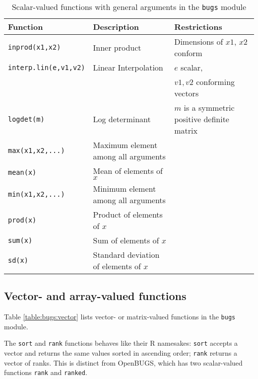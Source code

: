 \documentclass[11pt, a4paper, titlepage]{report}
\newcommand{\OpenBUGS}{\textsf{OpenBUGS}}
\begin{document}
\begin{table}
\begin{tabular}{lll}
\hline
Function & Description & Restrictions \\
\hline
\verb+inprod(x1,x2)+ & Inner product & Dimensions of $x1$, $x2$ conform \\
\verb+interp.lin(e,v1,v2)+ & Linear Interpolation & $e$ scalar, \\
                          &                     & $v1,v2$ conforming vectors \\
\verb+logdet(m)+ & Log determinant & $m$ is a symmetric positive definite matrix \\
\verb+max(x1,x2,...)+ & Maximum element among all arguments & \\
\verb+mean(x)+  & Mean of elements of $x$ & \\
\verb+min(x1,x2,...)+ & Minimum element among all arguments & \\
\verb+prod(x)+  & Product of elements of $x$ & \\
\verb+sum(x)+   & Sum of elements of $x$& \\
\verb+sd(x)+    & Standard deviation of elements of $x$ & \\
\hline
\end{tabular}
\caption{Scalar-valued functions with general
  arguments in the \texttt{bugs} module \label{table:bugs:scalar2}}
\end{table}

\subsection{Vector- and array-valued functions}

Table \ref{table:bugs:vector} lists vector- or matrix-valued functions
in the \texttt{bugs} module.

The \texttt{sort} and \texttt{rank} functions behaves like their R
namesakes: \texttt{sort} accepts a vector and returns the same values
sorted in ascending order; \texttt{rank} returns a vector of ranks.
This is distinct from \OpenBUGS, which has two scalar-valued functions
\verb+rank+ and \verb+ranked+.
\end{document}
